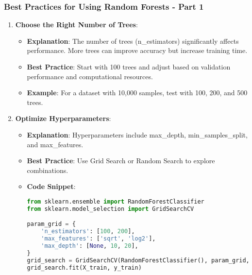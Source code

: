 \documentclass[aspectratio=169]{beamer}
\begin{document}
\begin{frame}[fragile]
    \frametitle{Best Practices for Using Random Forests - Part 1}
    \begin{enumerate}
        \item \textbf{Choose the Right Number of Trees}:
        \begin{itemize}
            \item \textbf{Explanation}: The number of trees (n\_estimators) significantly affects performance. More trees can improve accuracy but increase training time.
            \item \textbf{Best Practice}: Start with 100 trees and adjust based on validation performance and computational resources.
            \item \textbf{Example}: For a dataset with 10,000 samples, test with 100, 200, and 500 trees.
        \end{itemize}
        
        \item \textbf{Optimize Hyperparameters}:
        \begin{itemize}
            \item \textbf{Explanation}: Hyperparameters include max\_depth, min\_samples\_split, and max\_features.
            \item \textbf{Best Practice}: Use Grid Search or Random Search to explore combinations.
            \item \textbf{Code Snippet}:
            \begin{lstlisting}[language=Python]
from sklearn.ensemble import RandomForestClassifier
from sklearn.model_selection import GridSearchCV

param_grid = {
    'n_estimators': [100, 200],
    'max_features': ['sqrt', 'log2'],
    'max_depth': [None, 10, 20],
}
grid_search = GridSearchCV(RandomForestClassifier(), param_grid, cv=5)
grid_search.fit(X_train, y_train)
            \end{lstlisting}
        \end{itemize}
    \end{enumerate}
\end{frame}
\end{document}

